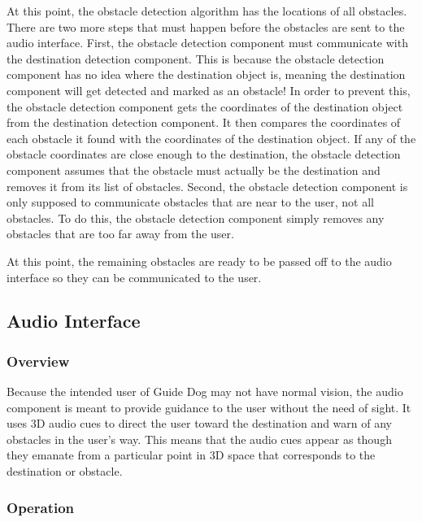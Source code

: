 At this point, the obstacle detection algorithm has the locations of all
obstacles. There are two more steps that must happen before the obstacles are
sent to the audio interface. First, the obstacle detection component must
communicate with the destination detection component. This is because
the obstacle detection component has no idea where the destination object is,
meaning the destination component will get detected and marked as an obstacle!
In order to prevent this, the obstacle detection component gets the coordinates
of the destination object from the destination detection component. It then
compares the coordinates of each obstacle it found with the coordinates of the
destination object. If any of the obstacle coordinates are close enough to the
destination, the obstacle detection component assumes that the obstacle must
actually be the destination and removes it from its list of obstacles. Second,
the obstacle detection component is only supposed to communicate obstacles that
are near to the user, not all obstacles. To do this, the obstacle detection
component simply removes any obstacles that are too far away from the user.

At this point, the remaining obstacles are ready to be passed off to the audio
interface so they can be communicated to the user.

\subsection{Audio Interface}
\label{sec:technical-audio}

\subsubsection{Overview}
\label{sec:technical-audio-overview}

Because the intended user of Guide Dog may not have normal vision, the audio 
component is meant to provide guidance to the user without the need of sight. It
uses 3D audio cues to direct the user toward the destination and warn of any 
obstacles in the user's way. This means that the audio cues appear as though
they emanate from a particular point in 3D space that corresponds to the
destination or obstacle.

\subsubsection{Operation}
\label{sec:technical-audio-op}

